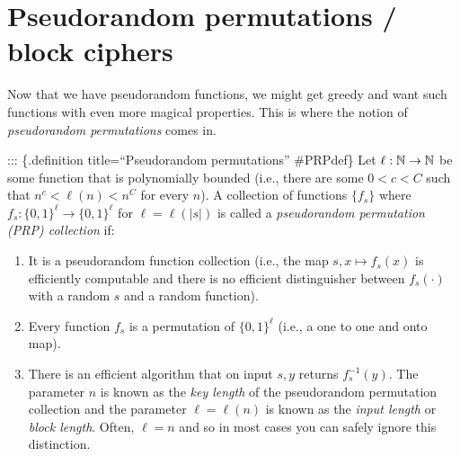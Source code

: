 \section{Pseudorandom permutations / block
ciphers}\label{5-Pseudorandom-permutati}

Now that we have pseudorandom functions, we might get greedy and want
such functions with even more magical properties. This is where the
notion of \emph{pseudorandom permutations} comes in.

::: \{.definition title=``Pseudorandom permutations'' \#PRPdef\} Let
\(\ell:{\mathbb{N}} \rightarrow {\mathbb{N}}\) be some function that is polynomially bounded
(i.e., there are some \(0<c<C\) such that \(n^c < \ell(n) < n^C\) for
every \(n\)). A collection of functions \(\{ f_s \}\) where
\(f_s:\{0,1\}^{\ell} \rightarrow\{0,1\}^{\ell}\) for \(\ell=\ell(|s|)\)
is called a \emph{pseudorandom permutation (PRP) collection} if:

\begin{enumerate}
\def\labelenumi{\arabic{enumi}.}
\tightlist
\item
  It is a pseudorandom function collection (i.e., the map
  \(s,x \mapsto f_s(x)\) is efficiently computable and there is no
  efficient distinguisher between \(f_s(\cdot)\) with a random \(s\) and
  a random function).\\
\item
  Every function \(f_s\) is a permutation of \(\{0,1\}^\ell\) (i.e., a
  one to one and onto map).\\
\item
  There is an efficient algorithm that on input \(s,y\) returns
  \(f_s^{-1}(y)\). The parameter \(n\) is known as the \emph{key length}
  of the pseudorandom permutation collection and the parameter
  \(\ell=\ell(n)\) is known as the \emph{input length} or \emph{block
  length}. Often, \(\ell=n\) and so in most cases you can safely ignore
  this distinction.
\end{enumerate}


